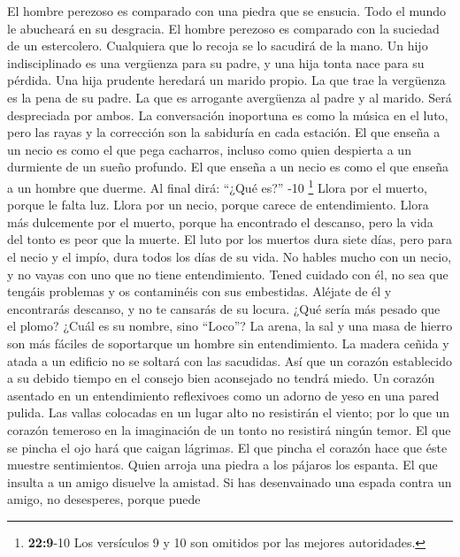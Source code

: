  El hombre perezoso es comparado con una piedra que se
ensucia. Todo el mundo le abucheará en su desgracia.  El
hombre perezoso es comparado con la suciedad de un estercolero.
Cualquiera que lo recoja se lo sacudirá de la mano.  Un
hijo indisciplinado es una vergüenza para su padre, y una hija tonta
nace para su pérdida.  Una hija prudente heredará un
marido propio. La que trae la vergüenza es la pena de su padre.
 La que es arrogante avergüenza al padre y al marido. Será
despreciada por ambos.  La conversación inoportuna es como
la música en el luto, pero las rayas y la corrección son la sabiduría en
cada estación.  El que enseña a un necio es como el que
pega cacharros, incluso como quien despierta a un durmiente de un sueño
profundo.  El que enseña a un necio es como el que enseña
a un hombre que duerme. Al final dirá: ``¿Qué es?'' -10
\footnote{\textbf{22:9}-10 Los versículos 9 y 10 son omitidos por las
  mejores autoridades.}  Llora por el muerto, porque le
falta luz. Llora por un necio, porque carece de entendimiento. Llora más
dulcemente por el muerto, porque ha encontrado el descanso, pero la vida
del tonto es peor que la muerte.  El luto por los muertos
dura siete días, pero para el necio y el impío, dura todos los días de
su vida.  No hables mucho con un necio, y no vayas con
uno que no tiene entendimiento. Tened cuidado con él, no sea que tengáis
problemas y os contaminéis con sus embestidas. Aléjate de él y
encontrarás descanso, y no te cansarás de su locura. 
¿Qué sería más pesado que el plomo? ¿Cuál es su nombre, sino ``Loco''?
 La arena, la sal y una masa de hierro son más fáciles de
soportarque un hombre sin entendimiento.  La madera
ceñida y atada a un edificio no se soltará con las sacudidas. Así que un
corazón establecido a su debido tiempo en el consejo bien aconsejado no
tendrá miedo.  Un corazón asentado en un entendimiento
reflexivoes como un adorno de yeso en una pared pulida. 
Las vallas colocadas en un lugar alto no resistirán el viento; por lo
que un corazón temeroso en la imaginación de un tonto no resistirá
ningún temor.  El que se pincha el ojo hará que caigan
lágrimas. El que pincha el corazón hace que éste muestre sentimientos.
 Quien arroja una piedra a los pájaros los espanta. El
que insulta a un amigo disuelve la amistad.  Si has
desenvainado una espada contra un amigo, no desesperes, porque puede
